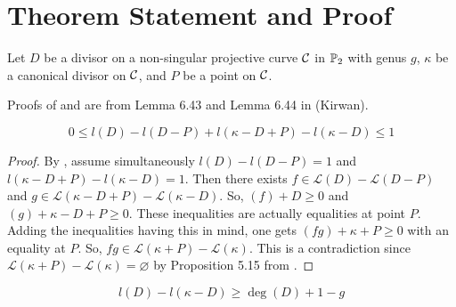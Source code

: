 \section{Theorem Statement and Proof}

Let $D$ be a divisor on a non-singular projective curve $\mathcal C$ in $\mathbb P_2$ with genus $g$, $\kappa$ be a canonical divisor on $\mathcal C$, and $P$ be a point on $\mathcal C$.

Proofs of  and  are from Lemma 6.43 and Lemma 6.44 in \cite{ref:kirwan} (Kirwan).

\begin{lemma}\label{lemma:ld_ldp}
    $$0\leq l(D)-l(D-P)+l(\kappa-D+P)-l(\kappa-D)\leq 1$$
\end{lemma}

\begin{proof}
    By , assume simultaneously $l(D)-l(D-P)=1$ and $l(\kappa-D+P)-l(\kappa-D)=1$. Then there exists $f\in\mathcal{L}(D)-\mathcal{L}(D-P)$ and $g\in\mathcal{L}(\kappa-D+P)-\mathcal{L}(\kappa-D)$. So, $(f)+D\geq 0$ and $(g)+\kappa-D+P\geq 0$. These inequalities are actually equalities at point $P$. Adding the inequalities having this in mind, one gets $(fg)+\kappa+P\geq 0$ with an equality at $P$. So, $fg\in\mathcal{L}(\kappa+P)-\mathcal{L}(\kappa)$. This is a contradiction since $\mathcal{L}(\kappa+P)-\mathcal{L}(\kappa)=\varnothing$ by Proposition 5.15 from \cite{ref:hampus}.
\end{proof}

\begin{lemma}\label{lemma:halfrr}
    $$l(D)-l(\kappa-D)\geq\deg(D)+1-g$$
\end{lemma}

